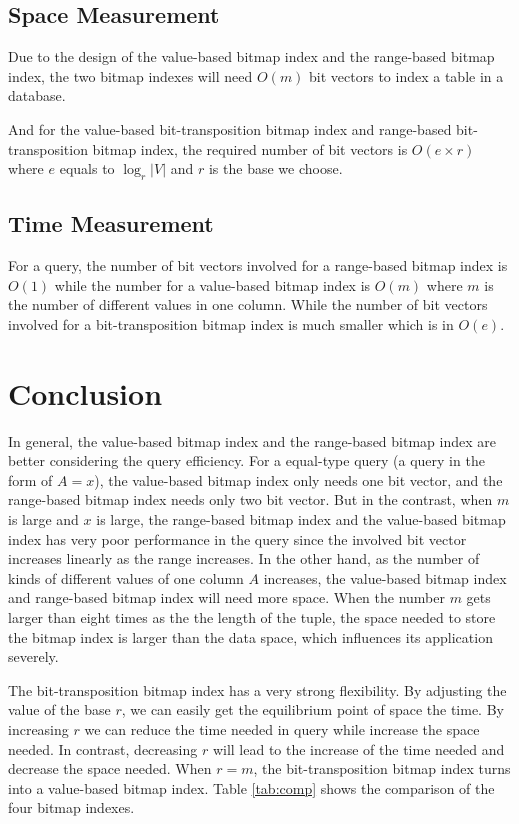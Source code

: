 \documentclass[12pt, a4paper]{article}
\begin{document}
\subsection{Space Measurement}

Due to the design of the value-based bitmap index and the range-based bitmap index, the two bitmap indexes will need $O(m)$ bit vectors to index a table in a database.

And for the value-based bit-transposition bitmap index and range-based bit-transposition bitmap index, the required number of bit vectors is $O(e\times r)$ where $e$ equals to $\log_r|V|$ and $r$ is the base we choose.

\subsection{Time Measurement}

For a query, the number of bit vectors involved for a range-based bitmap index is $O(1)$ while the number for a value-based bitmap index is $O(m)$ where $m$ is the number of different values in one column. While the number of bit vectors involved for a bit-transposition bitmap index is much smaller which is in $O(e)$.

\section{Conclusion}\label{sec:conclude}

In general, the value-based bitmap index and the range-based bitmap index are better considering the query efficiency. For a equal-type query (a query in the form of $A=x$), the value-based bitmap index only needs one bit vector, and the range-based bitmap index needs only two bit vector. But in the contrast, when $m$ is large and $x$ is large, the range-based bitmap index and the value-based bitmap index has very poor performance in the query since the involved bit vector increases linearly as the range increases. In the other hand, as the number of kinds of different values of one column $A$ increases, the value-based bitmap index and range-based bitmap index will need more space. When the number $m$ gets larger than eight times as the the length of the tuple, the space needed to store the bitmap index is larger than the data space, which influences its application severely.

The bit-transposition bitmap index has a very strong flexibility. By adjusting the value of the base $r$, we can easily get the equilibrium point of space the time. By increasing $r$ we can reduce the time needed in query while increase the space needed. In contrast, decreasing $r$ will lead to the increase of the time needed and decrease the space needed. When $r=m$, the bit-transposition bitmap index turns into a value-based bitmap index. Table \ref{tab:comp} shows the comparison of the four bitmap indexes.
\end{document}
